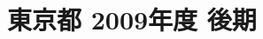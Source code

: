 \documentclass[../../hsm_tok_q.tex]{subfiles}
\begin{document}
    \section{東京都 2009年度 後期}
    \subsection{　}
    
    \newpage
    \subsection{　}
    
    \newpage
    \subsection{　}
    
    \newpage
    \subsection{　}
    
    \newpage
    \subsection{　}
    
\end{document}
